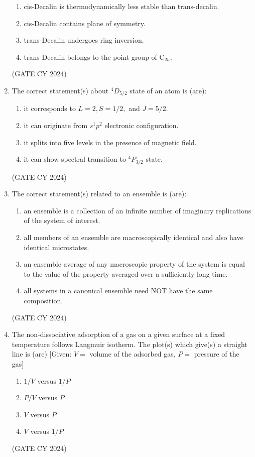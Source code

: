 \documentclass[12pt]{article}
\begin{document}
\begin{enumerate}
\begin{enumerate}
\item cis-Decalin is thermodynamically less stable than trans-decalin.
\item cis-Decalin contains plane of symmetry.
\item trans-Decalin undergoes ring inversion.
\item trans-Decalin belongs to the point group of C$_{2h}$.
\end{enumerate} \hfill (GATE CY 2024)

\item The correct statement(s) about $^4D_{5/2}$ state of an atom is (are):  
\begin{enumerate}
    \item it corresponds to $L = 2, S = 1/2,$ and $J = 5/2$.
    \item it can originate from $s^1p^2$ electronic configuration.
    \item it splits into five levels in the presence of magnetic field.
    \item it can show spectral transition to $^4P_{3/2}$ state.
\end{enumerate}
\hfill (GATE CY 2024)

\item The correct statement(s) related to an ensemble is (are):  
\begin{enumerate}
    \item an ensemble is a collection of an infinite number of imaginary replications of the system of interest.
    \item all members of an ensemble are macroscopically identical and also have identical microstates.
    \item an ensemble average of any macroscopic property of the system is equal to the value of the property averaged over a sufficiently long time.
    \item all systems in a canonical ensemble need NOT have the same composition.
\end{enumerate}
\hfill (GATE CY 2024)

\item The non-dissociative adsorption of a gas on a given surface at a fixed temperature follows Langmuir isotherm. The plot(s) which give(s) a straight line is (are)  
[Given: $V =$ volume of the adsorbed gas, $P =$ pressure of the gas]  
\begin{enumerate}
    \item $1/V$ versus $1/P$
    \item $P/V$ versus $P$
    \item $V$ versus $P$
    \item $V$ versus $1/P$
\end{enumerate}
\hfill (GATE CY 2024)


\end{enumerate}
\end{document}
